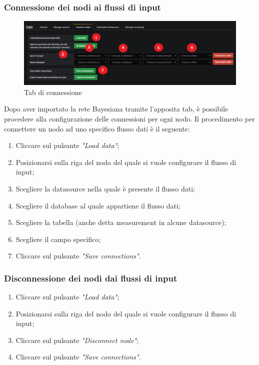 \subsubsection{Connessione dei nodi ai flussi di input}
\begin{figure} [H]
	\centering
	\includegraphics[scale=0.53]{Img/configurazionerete} 
	\caption{Tab di connessione} \label{} 
\end{figure} 
Dopo aver importato la rete Bayesiana tramite l'apposita tab, è possibile procedere alla configurazione delle connessioni per ogni nodo.
Il procedimento per connettere un nodo ad uno specifico flusso dati è il seguente:
\begin{enumerate}
	\item Cliccare sul pulsante \emph{"Load data"};
	\item Posizionarsi sulla riga del nodo del quale si vuole configurare il flusso di input;
	\item Scegliere la datasource nella quale è presente il flusso dati;
	\item Scegliere il database al quale appartiene il flusso dati;
	\item Scegliere la tabella (anche detta measurement in alcune datasource);
	\item Scegliere il campo specifico;
	\item Cliccare sul pulsante \emph{"Save connections"}.
\end{enumerate}
\subsubsection{Disconnessione dei nodi dai flussi di input}
\begin{enumerate}
	\item Cliccare sul pulsante \emph{"Load data"};
	\item Posizionarsi sulla riga del nodo del quale si vuole configurare il flusso di input;
	\item Cliccare sul pulsante \emph{"Disconnect node"};
	\item Cliccare sul pulsante \emph{"Save connections"}.
\end{enumerate}
